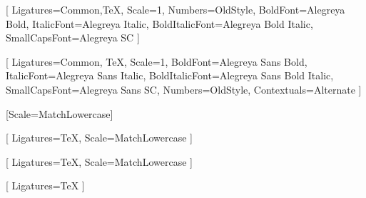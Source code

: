 %



\setmainfont{Alegreya}[
    Ligatures={Common,TeX},
    Scale=1, %
    Numbers={OldStyle},
    BoldFont=Alegreya Bold,
    ItalicFont=Alegreya Italic,
    BoldItalicFont=Alegreya Bold Italic,
    SmallCapsFont=Alegreya SC
]

\setsansfont{Alegreya Sans}[
    Ligatures={Common, TeX},
    Scale=1,
    BoldFont=Alegreya Sans Bold,
    ItalicFont=Alegreya Sans Italic,
    BoldItalicFont=Alegreya Sans Bold Italic,
    SmallCapsFont=Alegreya Sans SC,
    Numbers={OldStyle},
    Contextuals={Alternate}
]

\setmonofont{Iosevka}[Scale=MatchLowercase]

[
    Ligatures=TeX,
    Scale=MatchLowercase
]

\setmathfontface{}[
    Ligatures=TeX,
    Scale=MatchLowercase
]

\setoperatorfont\mathoper

\newfontface{}[
    Ligatures=TeX
]
